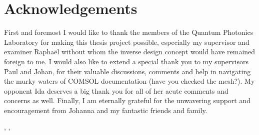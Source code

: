 \thispagestyle{plain}           %
\section*{Acknowledgements}

First and foremost I would like to thank the members of the Quantum Photonics
Laboratory for making this thesis project possible,
especially my supervisor and examiner Raphaël without whom the inverse design
concept would have remained foreign to me.
I would also like to extend a special thank you to my supervisors Paul and Johan, for their valuable
discussions, comments and help in navigating the murky waters of COMSOL
documentation (have you checked the mesh?).
My opponent Ida deserves a big thank you for all of her acute comments and
concerns as well.
Finally, I am eternally grateful for the unwavering support and encouragement
from Johanna and my fantastic friends and family.

\hfill
\thesisAuthor, \thesisCity, \thesisMonth\ \thesisYear

\if{}
\newpage                %
\thispagestyle{empty}
\mbox{}
\fi
